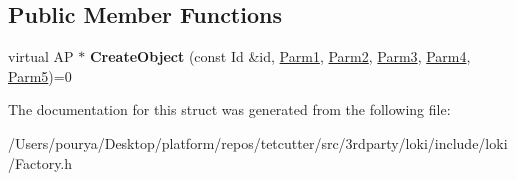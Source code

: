 \subsection*{Public Member Functions}
\begin{DoxyCompactItemize}
\item 
\hypertarget{structLoki_1_1FactoryImpl_3_01AP_00_01Id_00_01LOKI__TYPELIST__5_07P1_00_01P2_00_01P3_00_01P4_00_01P5_08_4_a0cae2930d4f91a4bc4e2ee35a214da98}{}virtual A\+P $\ast$ {\bfseries Create\+Object} (const Id \&id, \hyperlink{classLoki_1_1EmptyType}{Parm1}, \hyperlink{classLoki_1_1EmptyType}{Parm2}, \hyperlink{classLoki_1_1EmptyType}{Parm3}, \hyperlink{classLoki_1_1EmptyType}{Parm4}, \hyperlink{classLoki_1_1EmptyType}{Parm5})=0\label{structLoki_1_1FactoryImpl_3_01AP_00_01Id_00_01LOKI__TYPELIST__5_07P1_00_01P2_00_01P3_00_01P4_00_01P5_08_4_a0cae2930d4f91a4bc4e2ee35a214da98}

\end{DoxyCompactItemize}


The documentation for this struct was generated from the following file\+:\begin{DoxyCompactItemize}
\item 
/\+Users/pourya/\+Desktop/platform/repos/tetcutter/src/3rdparty/loki/include/loki/Factory.\+h\end{DoxyCompactItemize}
